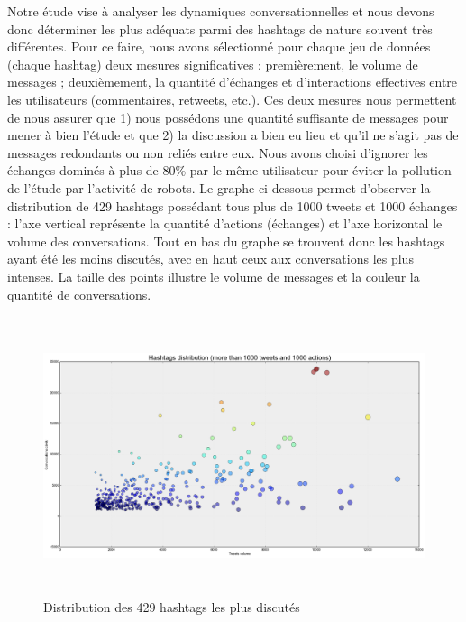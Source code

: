 Notre étude vise à analyser les dynamiques conversationnelles et nous devons donc déterminer les plus adéquats parmi des hashtags de nature souvent très différentes. Pour ce faire, nous avons sélectionné pour chaque jeu de données (chaque hashtag) deux mesures significatives : premièrement, le volume de messages ; deuxièmement, la quantité d{\textquoteright}échanges et d{\textquoteright}interactions effectives entre les utilisateurs (commentaires, retweets, etc.). Ces deux mesures nous permettent de nous assurer que 1) nous possédons une quantité suffisante de messages pour mener à bien l{\textquoteright}étude et que 2) la discussion a bien eu lieu et qu{\textquoteright}il ne s{\textquoteright}agit pas de messages redondants ou non reliés entre eux. Nous avons choisi d{\textquoteright}ignorer les échanges dominés à plus de 80\% par le m\^eme utilisateur pour éviter la pollution de l{\textquoteright}étude par l{\textquoteright}activité de robots. Le graphe ci-dessous permet d{\textquoteright}observer la distribution de 429 hashtags possédant tous plus de 1000 tweets et 1000 échanges : l{\textquoteright}axe vertical représente la quantité d{\textquoteright}actions (échanges) et l{\textquoteright}axe horizontal le volume des conversations. Tout en bas du graphe se trouvent donc les hashtags ayant été les moins discutés, avec en haut ceux aux conversations les plus intenses. La taille des points illustre le volume de messages et la couleur la quantité de conversations.

\begin{figure}[htpb]
    \centering
    \includegraphics[width=6.0114in,height=3.2114in]{figures/chap3/chapitre3-img8.png}
    \caption{Distribution des 429 hashtags les plus discutés}
\end{figure}


